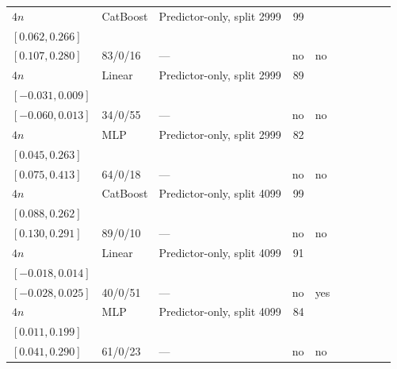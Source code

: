 \begin{longtable}{@{}ll>{\raggedright\arraybackslash}p{1.1in}rllrlll@{}}
$4n$ & CatBoost & Predictor-only, split 2999 & 99 & \begin{tabular}[t]{@{}l@{}}$0.177$\\\tiny$[0.062, 0.266]$\end{tabular} & \begin{tabular}[t]{@{}l@{}}$0.198$\\\tiny$[0.107, 0.280]$\end{tabular} & 83/0/16 & --- & no & no \\
$4n$ & Linear & Predictor-only, split 2999 & 89 & \begin{tabular}[t]{@{}l@{}}$-0.007$\\\tiny$[-0.031, 0.009]$\end{tabular} & \begin{tabular}[t]{@{}l@{}}$-0.010$\\\tiny$[-0.060, 0.013]$\end{tabular} & 34/0/55 & --- & no & no \\
$4n$ & MLP & Predictor-only, split 2999 & 82 & \begin{tabular}[t]{@{}l@{}}$0.144$\\\tiny$[0.045, 0.263]$\end{tabular} & \begin{tabular}[t]{@{}l@{}}$0.202$\\\tiny$[0.075, 0.413]$\end{tabular} & 64/0/18 & --- & no & no \\
$4n$ & CatBoost & Predictor-only, split 4099 & 99 & \begin{tabular}[t]{@{}l@{}}$0.188$\\\tiny$[0.088, 0.262]$\end{tabular} & \begin{tabular}[t]{@{}l@{}}$0.209$\\\tiny$[0.130, 0.291]$\end{tabular} & 89/0/10 & --- & no & no \\
$4n$ & Linear & Predictor-only, split 4099 & 91 & \begin{tabular}[t]{@{}l@{}}$-0.003$\\\tiny$[-0.018, 0.014]$\end{tabular} & \begin{tabular}[t]{@{}l@{}}$-0.002$\\\tiny$[-0.028, 0.025]$\end{tabular} & 40/0/51 & --- & no & yes \\
$4n$ & MLP & Predictor-only, split 4099 & 84 & \begin{tabular}[t]{@{}l@{}}$0.113$\\\tiny$[0.011, 0.199]$\end{tabular} & \begin{tabular}[t]{@{}l@{}}$0.154$\\\tiny$[0.041, 0.290]$\end{tabular} & 61/0/23 & --- & no & no \\

\end{longtable}
